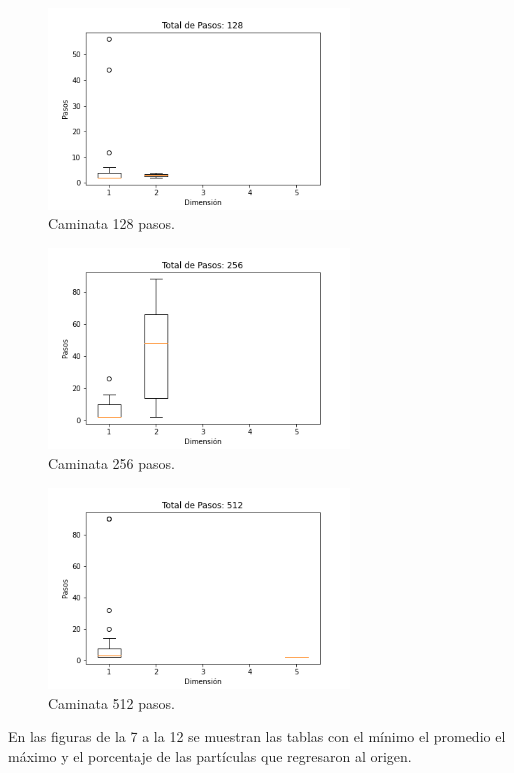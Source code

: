 \documentclass{article}
\begin{document}
\begin{figure}[H]
\centering
\includegraphics[width=80mm]{p1_pasos_de_128.png}
\caption{\label{fig1}Caminata 128 pasos.}
\end{figure}
\begin{figure}[H]
\centering
\includegraphics[width=80mm]{p1_pasos_de_256.png}
\caption{\label{fig1}Caminata 256 pasos.}
\end{figure}
\begin{figure}[H]
\centering
\includegraphics[width=80mm]{p1_pasos_de_512.png}
\caption{\label{fig1}Caminata 512 pasos.}
\end{figure}

En las figuras de la 7 a la 12 se muestran las tablas con el mínimo el promedio el máximo y el porcentaje de las partículas que regresaron al origen.
\end{document}
